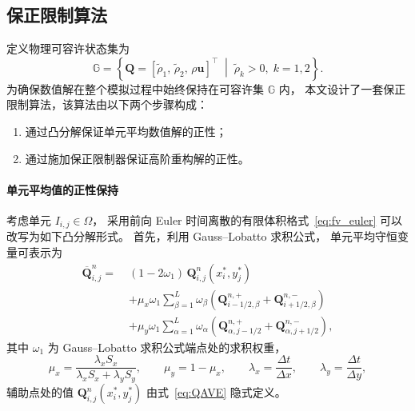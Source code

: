 \documentclass[12pt,a4paper]{article}
\numberwithin{equation}{section}    %
\begin{document}
\begin{figure}[!htbp]
    \centering
    
    \caption{}
    \label{fig:}
\end{figure}




\subsection{保正限制算法}
\label{sec:pplimiter}


定义物理可容许状态集为
\begin{equation}
    \label{eq:SET}
    \mathbb{G} = \left\{
    \bm{Q} = [\tilde{\rho}_1,\, \tilde{\rho}_2,\, \rho\bm{u}]^\top
    \;\middle|\;
    \tilde{\rho}_k > 0,\; k = 1, 2
    \right\}.
\end{equation}
为确保数值解在整个模拟过程中始终保持在可容许集 $\mathbb{G}$ 内，
本文设计了一套保正限制算法，该算法由以下两个步骤构成：
\begin{enumerate}
    \item 通过凸分解保证单元平均数值解的正性；
    \item 通过施加保正限制器保证高阶重构解的正性。
\end{enumerate}

\paragraph{单元平均值的正性保持}

考虑单元 $I_{i,j} \in \Omega$，
采用前向 Euler 时间离散的有限体积格式~\eqref{eq:fv_euler}
可以改写为如下凸分解形式。
首先，利用 Gauss--Lobatto 求积公式，
单元平均守恒变量可表示为
\begin{equation}
    \label{eq:QAVE}
    \begin{aligned}
        \overline{\bm{Q}}_{i,j}^n
        = \;&(1 - 2\omega_1)\,\bm{Q}_{i,j}^n(x_i^*, y_j^*)  \\
        &+ \mu_x\omega_1 \sum_{\beta=1}^{L} \omega_\beta
        \left(
        \bm{Q}_{i-1/2,\beta}^{n,+} + \bm{Q}_{i+1/2,\beta}^{n,-}
        \right) \\
        &+ \mu_y\omega_1 \sum_{\alpha=1}^{L} \omega_\alpha
        \left(
        \bm{Q}_{\alpha,j-1/2}^{n,+} + \bm{Q}_{\alpha,j+1/2}^{n,-}
        \right),
    \end{aligned}
\end{equation}
其中 $\omega_1$ 为 Gauss--Lobatto 求积公式端点处的求积权重，
\begin{equation}
    \mu_x = \frac{\lambda_x S_x}{\lambda_x S_x + \lambda_y S_y},
    \qquad \mu_y = 1 - \mu_x,
    \qquad \lambda_x = \frac{\Delta t}{\Delta x},
    \qquad \lambda_y = \frac{\Delta t}{\Delta y},
\end{equation}
辅助点处的值 $\bm{Q}_{i,j}^n(x_i^*, y_j^*)$ 由式~\eqref{eq:QAVE}
隐式定义。
\end{document}
